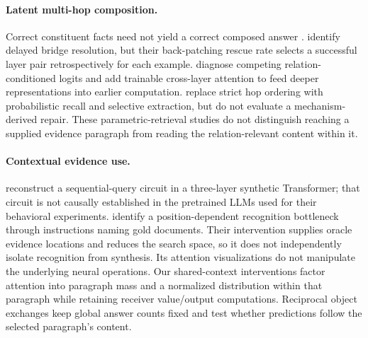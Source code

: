 \paragraph{Latent multi-hop composition.}
Correct constituent facts need not yield a correct composed answer \citep{press2023compositionality}. \citet{biran2024hopping} identify delayed bridge resolution, but their back-patching rescue rate selects a successful layer pair retrospectively for each example. \citet{yu2025back} diagnose competing relation-conditioned logits and add trainable cross-layer attention to feed deeper representations into earlier computation. \citet{liu2026layerorder} replace strict hop ordering with probabilistic recall and selective extraction, but do not evaluate a mechanism-derived repair. These parametric-retrieval studies do not distinguish reaching a supplied evidence paragraph from reading the relation-relevant content within it.

\paragraph{Contextual evidence use.}
\citet{guo2025twohop} reconstruct a sequential-query circuit in a three-layer synthetic Transformer; that circuit is not causally established in the pretrained LLMs used for their behavioral experiments. \citet{zhang2026failure} identify a position-dependent recognition bottleneck through instructions naming gold documents. Their intervention supplies oracle evidence locations and reduces the search space, so it does not independently isolate recognition from synthesis. Its attention visualizations do not manipulate the underlying neural operations. Our shared-context interventions factor attention into paragraph mass and a normalized distribution within that paragraph while retaining receiver value/output computations. Reciprocal object exchanges keep global answer counts fixed and test whether predictions follow the selected paragraph's content.

